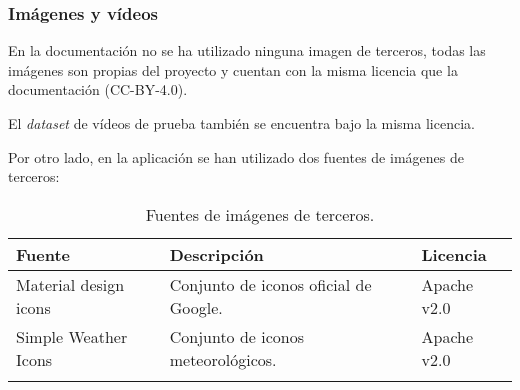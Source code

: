 \subsubsection{Imágenes y vídeos}\label{imuxe1genes-y-vuxeddeos}

En la documentación no se ha utilizado ninguna imagen de terceros, todas
las imágenes son propias del proyecto y cuentan con la misma licencia
que la documentación (CC-BY-4.0).

El \emph{dataset} de vídeos de prueba también se encuentra bajo la misma
licencia.

Por otro lado, en la aplicación se han utilizado dos fuentes de imágenes
de terceros:

\begin{longtable}[]{@{}lll@{}}
\toprule
\begin{minipage}[b]{0.28\columnwidth}\raggedright\strut
Fuente\strut
\end{minipage} & \begin{minipage}[b]{0.46\columnwidth}\raggedright\strut
Descripción\strut
\end{minipage} & \begin{minipage}[b]{0.17\columnwidth}\raggedright\strut
Licencia\strut
\end{minipage}\tabularnewline
\midrule
\endhead
\begin{minipage}[t]{0.28\columnwidth}\raggedright\strut
Material design icons\strut
\end{minipage} & \begin{minipage}[t]{0.46\columnwidth}\raggedright\strut
Conjunto de iconos oficial de Google.\strut
\end{minipage} & \begin{minipage}[t]{0.17\columnwidth}\raggedright\strut
Apache v2.0\strut
\end{minipage}\tabularnewline
\begin{minipage}[t]{0.28\columnwidth}\raggedright\strut
Simple Weather Icons\strut
\end{minipage} & \begin{minipage}[t]{0.46\columnwidth}\raggedright\strut
Conjunto de iconos meteorológicos.\strut
\end{minipage} & \begin{minipage}[t]{0.17\columnwidth}\raggedright\strut
Apache v2.0\strut
\end{minipage}\tabularnewline
\bottomrule
\caption{Fuentes de imágenes de terceros.}
\end{longtable}

